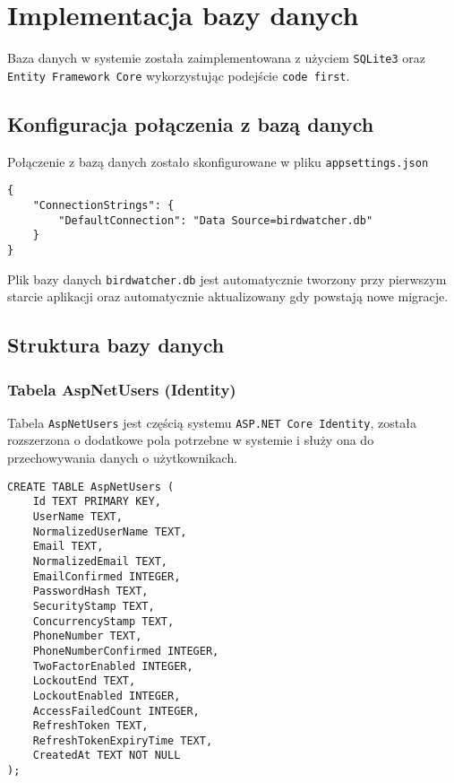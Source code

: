\section{Implementacja bazy danych}
Baza danych w systemie została zaimplementowana z użyciem \texttt{SQLite3} oraz \texttt{Entity Framework Core} wykorzystując podejście \texttt{code first}.

\subsection{Konfiguracja połączenia z bazą danych}
Połączenie z bazą danych zostało skonfigurowane w pliku \texttt{appsettings.json}

\begin{lstlisting}[style=csharp, caption={Konfiguracja bazy w appsettings.json}]
{
	"ConnectionStrings": {
		"DefaultConnection": "Data Source=birdwatcher.db"
	}
}
\end{lstlisting}

Plik bazy danych \texttt{birdwatcher.db} jest automatycznie tworzony przy pierwszym starcie aplikacji oraz automatycznie aktualizowany gdy powstają nowe migracje.

\subsection{Struktura bazy danych}

\subsubsection{Tabela AspNetUsers (Identity)}
Tabela \texttt{AspNetUsers} jest częścią systemu \texttt{ASP.NET Core Identity}, została rozszerzona o dodatkowe pola potrzebne w systemie i służy ona do przechowywania danych o użytkownikach.

\begin{lstlisting}[style=sqlstyle, caption={Struktura tabeli AspNetUsers}]
CREATE TABLE AspNetUsers (
	Id TEXT PRIMARY KEY,
	UserName TEXT,
	NormalizedUserName TEXT,
	Email TEXT,
	NormalizedEmail TEXT,
	EmailConfirmed INTEGER,
	PasswordHash TEXT,
	SecurityStamp TEXT,
	ConcurrencyStamp TEXT,
	PhoneNumber TEXT,
	PhoneNumberConfirmed INTEGER,
	TwoFactorEnabled INTEGER,
	LockoutEnd TEXT,
	LockoutEnabled INTEGER,
	AccessFailedCount INTEGER,
	RefreshToken TEXT,
	RefreshTokenExpiryTime TEXT,
	CreatedAt TEXT NOT NULL
);
\end{lstlisting}

